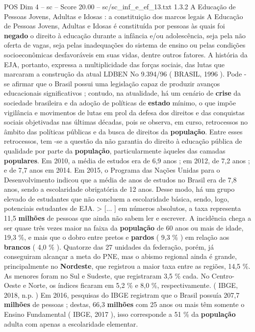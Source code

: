 \begin{textsample}{POS Dim 4 – sc – Score 20.00 – sc/sc\_inf\_e\_ef\_13.txt}  \label{ex:f4_pos_032}
1.3.2 A Educação de Pessoas Jovens, Adultas e Idosas : a constituição dos marcos legais A Educação de Pessoas Jovens, Adultas e Idosas é constituída por pessoas às quais foi \textbf{negado} o direito à educação durante a infância e/ou adolescência, seja pela não oferta de vagas, seja pelas inadequações do sistema de ensino ou pelas condições socioeconômicas desfavoráveis em suas vidas, dentre outros fatores.
A história da EJA, portanto, expressa a multiplicidade das forças sociais, das lutas que marcaram a construção da atual LDBEN No 9.394/96 ( BRASIL, 1996 ).
Pode -se afirmar que o Brasil possui uma legislação capaz de produzir avanços educacionais significativos ; contudo, na atualidade, há um cenário de \textbf{crise} da sociedade brasileira e da adoção de políticas de \textbf{estado} mínimo, o que impõe vigilância e movimentos de lutas em prol da defesa dos direitos e das conquistas sociais objetivadas nas últimas décadas, pois se observa, em curso, retrocessos no âmbito das políticas públicas e da busca de direitos da \textbf{população}.
Entre esses retrocessos, tem -se a questão da não garantia do direito à educação pública de qualidade por parte da \textbf{população}, particularmente àqueles das camadas \textbf{populares}.
Em 2010, a média de estudos era de 6,9 anos ; em 2012, de 7,2 anos ; e de 7,7 anos em 2014.
Em 2015, o Programa das Nações Unidas para o Desenvolvimento indicou que a média de anos de estudos no Brasil era de 7,8 anos, sendo a escolaridade obrigatória de 12 anos.
Desse modo, há um grupo elevado de estudantes que não concluem a escolaridade básica, sendo, logo, potenciais estudantes de EJA. > [... ] em números absolutos, a taxa representa 11,5 \textbf{milhões} de pessoas que ainda não sabem ler e escrever.
A incidência chega a ser quase três vezes maior na faixa da \textbf{população} de 60 anos ou mais de idade, 19,3 \%, e mais que o dobro entre pretos e \textbf{pardos} ( 9,3 \% ) em relação aos \textbf{brancos} ( 4,0 \% ).
Quatorze das 27 unidades da federação, porém, já conseguiram alcançar a meta do PNE, mas o abismo regional ainda é grande, principalmente no \textbf{Nordeste}, que registrou a maior taxa entre as regiões, 14,5 \%.
As menores foram no Sul e Sudeste, que registraram 3,5 \% cada.
No Centro-Oeste e Norte, os índices ficaram em 5,2 \% e 8,0 \%, respectivamente. ( IBGE, 2018, n.p. ) Em 2016, pesquisas do IBGE registram que o Brasil possuía 207,7 \textbf{milhões} de pessoas ; destas, 66,3 \textbf{milhões} com 25 anos ou mais têm somente o Ensino Fundamental ( IBGE, 2017 ), isso corresponde a 51 \% da \textbf{população} adulta com apenas a escolaridade elementar.

\end{textsample}
